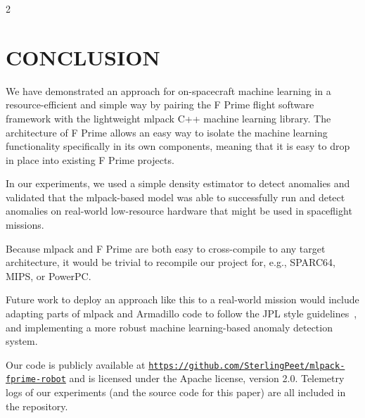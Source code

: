 \documentclass[10pt, fleqn]{article}
\begin{document}
\begin{multicols*}{2}
\section{CONCLUSION}

We have demonstrated an approach for on-spacecraft machine learning
in a resource-efficient and simple way
by pairing the F Prime flight software framework with
the lightweight mlpack C++ machine learning library.
The architecture of F Prime allows an easy way to
isolate the machine learning functionality specifically in its own components,
meaning that it is easy to drop in place into existing F Prime projects.

In our experiments,
we used a simple density estimator to detect anomalies
and validated that the mlpack-based model was able to
successfully run and detect anomalies
on real-world low-resource hardware
that might be used in spaceflight missions.

Because mlpack and F Prime are both easy to cross-compile to
any target architecture,
it would be trivial to recompile our project
for, e.g., SPARC64, MIPS, or PowerPC.

Future work to deploy an approach like this to a real-world mission would include
adapting parts of mlpack and Armadillo code to follow
the JPL style guidelines~\cite{jplstandards},
and implementing a more robust machine learning-based anomaly detection system.

Our code is publicly available at
\href{https://github.com/SterlingPeet/mlpack-fprime-robot}{\footnotesize \tt https://github.com/SterlingPeet/mlpack-fprime-robot}
and is licensed under the Apache license, version 2.0.
Telemetry logs of our experiments
(and the source code for this paper)
are all included in the repository.

\end{multicols*}


\end{document}
